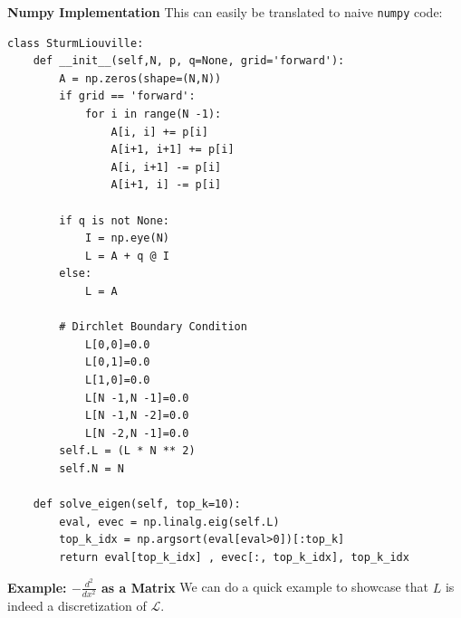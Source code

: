 \textbf{Numpy Implementation}
This can easily be translated to naive \texttt{numpy} code:

\begin{mystcodebox}
\begin{verbatim}
class SturmLiouville:
    def __init__(self,N, p, q=None, grid='forward'):
        A = np.zeros(shape=(N,N))
        if grid == 'forward':
            for i in range(N -1):
                A[i, i] += p[i]
                A[i+1, i+1] += p[i]
                A[i, i+1] -= p[i]
                A[i+1, i] -= p[i]

        if q is not None:
            I = np.eye(N) 
            L = A + q @ I
        else:
            L = A
        
        # Dirchlet Boundary Condition
            L[0,0]=0.0
            L[0,1]=0.0
            L[1,0]=0.0
            L[N -1,N -1]=0.0
            L[N -1,N -2]=0.0
            L[N -2,N -1]=0.0
        self.L = (L * N ** 2)
        self.N = N

    def solve_eigen(self, top_k=10):
        eval, evec = np.linalg.eig(self.L)
        top_k_idx = np.argsort(eval[eval>0])[:top_k]
        return eval[top_k_idx] , evec[:, top_k_idx], top_k_idx
\end{verbatim}

\end{mystcodebox}
\textbf{Example: $-\frac{d^2}{dx^2}$ as a Matrix}
We can do a quick example to showcase that $L$ is indeed a discretization of $\mathcal L$.

